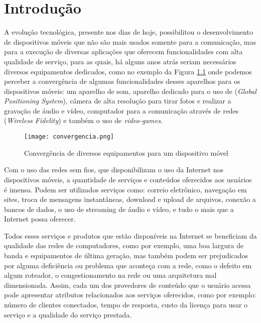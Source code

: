 \chapter{Introdução}\label{cha:introducao}

A evolução tecnológica, presente nos dias de hoje, possibilitou o desenvolvimento de dispositivos móveis que não são mais usados somente para a comunicação, mas para a execução de diversas aplicações que oferecem funcionalidades com alta qualidade de serviço, para as quais, há alguns anos atrás seriam necessários diversos equipamentos dedicados, como no exemplo da Figura \ref{fig:convergencia} onde podemos perceber a convergência de algumas funcionalidades desses aparelhos para os dispositivos móveis: um aparelho de som, aparelho dedicado para o uso de  (\textit{Global Positioning System}), câmera de alta resolução para tirar fotos e realizar a gravação de áudio e vídeo, computador para a comunicação através de redes  (\textit{Wireless Fidelity}) e também o uso de \textit{video-games}.

\begin{figure}[!htb]
	\centering
	\texttt{[image: convergencia.png]} %
	\small
	\caption[Convergência de diversos equipamentos para um dispositivo móvel]{Convergência de diversos equipamentos para um dispositivo móvel}
	\label{fig:convergencia}
\end{figure}

Com o uso das redes sem fios, que disponibilizam o uso da Internet nos dispositivos móveis, a quantidade de serviços e conteúdos oferecidos aos usuários é imensa. Podem ser utilizados serviços como: correio eletrônico, navegação em sites, troca de mensagens instantâneas, download e upload de arquivos, conexão a bancos de dados, o uso de streaming de áudio e vídeo, e tudo o mais que a Internet possa oferecer.

Todos esses serviços e produtos que estão disponíveis na Internet se beneficiam da qualidade das redes de computadores, como por exemplo, uma boa largura de banda e equipamentos de última geração, mas também podem ser prejudicados por alguma deficiência ou problema que aconteça com a rede, como o defeito em algum roteador, o congestionamento na rede ou uma arquitetura mal dimensionada. Assim, cada um dos provedores de conteúdo que o usuário acessa pode apresentar atributos relacionados aos serviços oferecidos, como por exemplo: número de clientes conectados, tempo de resposta, custo da licença para usar o serviço e a qualidade do serviço prestada.

